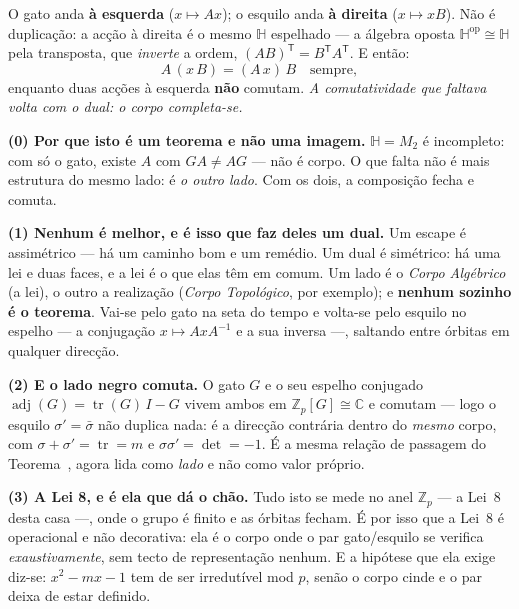 \documentclass[livro.tex]{subfiles}
\begin{document}
\begin{teorema}\label{thm:esquilo}
O gato anda \textbf{à esquerda} ($x\mapsto Ax$); o esquilo anda
\textbf{à direita} ($x\mapsto xB$). Não é duplicação: a acção à direita é
o mesmo $\mathbb{H}$ espelhado --- a álgebra oposta
$\mathbb{H}^{\mathrm{op}}\cong\mathbb{H}$ pela transposta, que
\emph{inverte} a ordem, $(AB)^{\mathsf T}=B^{\mathsf T}A^{\mathsf T}$.
E então:
\[
\boxed{\;A\,(x\,B)=(A\,x)\,B\quad\text{sempre},\;}
\]
enquanto duas acções à esquerda \textbf{não} comutam. \emph{A
comutatividade que faltava volta com o dual: o corpo completa-se.}

\textbf{(0) Por que isto é um teorema e não uma imagem.} $\mathbb{H}=M_2$
é incompleto: com só o gato, existe $A$ com $GA\neq AG$ --- não é corpo.
O que falta não é mais estrutura do mesmo lado: é \emph{o outro lado}.
Com os dois, a composição fecha e comuta.

\textbf{(1) Nenhum é melhor, e é isso que faz deles um dual.} Um escape é
assimétrico --- há um caminho bom e um remédio. Um dual é simétrico: há
uma lei e duas faces, e a lei é o que elas têm em comum. Um lado é o
\emph{Corpo Algébrico} (a lei), o outro a realização
(\emph{Corpo Topológico}, por exemplo); e \textbf{nenhum sozinho é o
teorema}. Vai-se pelo gato na seta do tempo e volta-se pelo esquilo no
espelho --- a conjugação $x\mapsto AxA^{-1}$ e a sua inversa ---,
saltando entre órbitas em qualquer direcção.

\textbf{(2) E o lado negro comuta.} O gato $G$ e o seu espelho conjugado
$\operatorname{adj}(G)=\operatorname{tr}(G)\,I-G$ vivem ambos em
$\mathbb{Z}_p[G]\cong\mathbb{C}$ e comutam --- logo o esquilo
$\sigma'=\bar\sigma$ não duplica nada: é a direcção contrária dentro do
\emph{mesmo} corpo, com
$\sigma+\sigma'=\operatorname{tr}=m$ e $\sigma\sigma'=\det=-1$. É a
mesma relação de passagem do Teorema~, agora lida como
\emph{lado} e não como valor próprio.

\textbf{(3) A Lei 8, e é ela que dá o chão.} Tudo isto se mede no anel
$\mathbb{Z}_p$ --- a Lei~8 desta casa ---, onde o grupo é finito e as
órbitas fecham. É por isso que a Lei~8 é operacional e não decorativa:
ela é o corpo onde o par gato/esquilo se verifica \emph{exaustivamente},
sem tecto de representação nenhum. E a hipótese que ela exige diz-se:
$x^{2}-mx-1$ tem de ser irredutível mod $p$, senão o corpo cinde e o par
deixa de estar definido.


\end{teorema}
\end{document}
